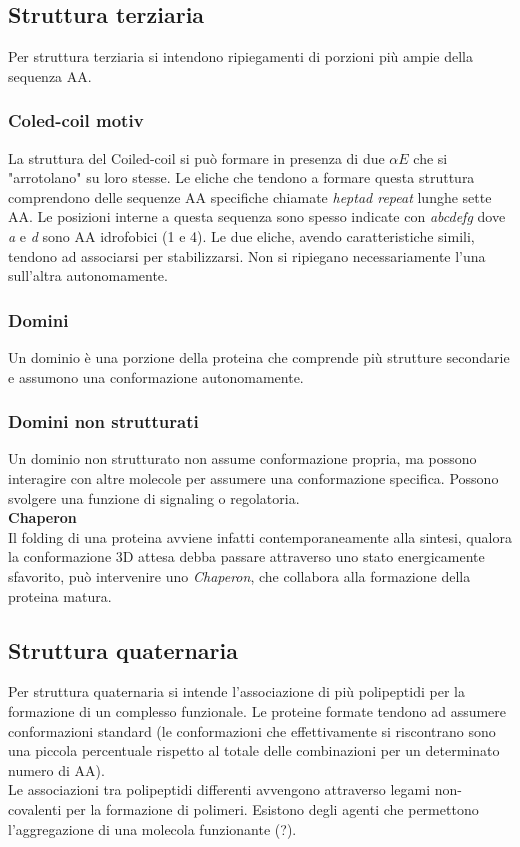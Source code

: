     
    \subsection{Struttura terziaria}
        Per struttura terziaria si intendono ripiegamenti di porzioni più ampie della sequenza AA. 
        
        \subsubsection{Coled-coil motiv}
            La struttura del Coiled-coil si può formare in presenza di due $\alpha E$ che si "arrotolano" su loro stesse. Le eliche che tendono a formare questa struttura comprendono delle sequenze AA specifiche chiamate \textit{heptad repeat} lunghe sette AA. 
            Le posizioni interne a questa sequenza sono spesso indicate con \textit{abcdefg} dove \textit{a} e \textit{d} sono AA idrofobici (1 e 4).
            Le due eliche, avendo caratteristiche simili, tendono ad associarsi per stabilizzarsi. Non si ripiegano necessariamente l'una sull'altra autonomamente.
        
        \subsubsection{Domini}
            Un dominio è una porzione della proteina che comprende più strutture secondarie e assumono una conformazione autonomamente.
        
        \subsubsection{Domini non strutturati}
            Un dominio non strutturato non assume conformazione propria, ma possono interagire con altre molecole per assumere una conformazione specifica. Possono svolgere una funzione di signaling o regolatoria.\\
            
            \textbf{Chaperon}\\
            Il folding di una proteina avviene infatti contemporaneamente alla sintesi, qualora la conformazione 3D attesa debba passare attraverso uno stato energicamente sfavorito, può intervenire uno \textit{Chaperon}, che collabora alla formazione della proteina matura.
        
    
    \subsection{Struttura quaternaria}
        Per struttura quaternaria si intende l'associazione di più polipeptidi per la formazione di un complesso funzionale. 
        Le proteine formate tendono ad assumere conformazioni standard (le conformazioni che effettivamente si riscontrano sono una piccola percentuale rispetto al totale delle combinazioni per un determinato numero di AA).\\
        Le associazioni tra polipeptidi differenti avvengono attraverso legami non-covalenti per la formazione di polimeri. Esistono degli agenti che permettono l'aggregazione di una molecola funzionante (?).
        
